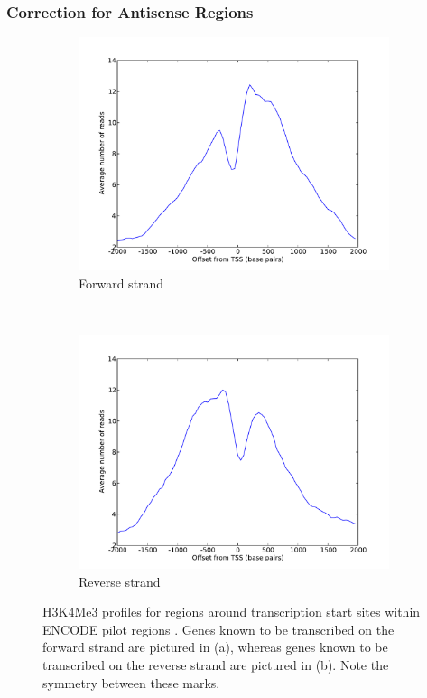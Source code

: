 \documentclass[parskip]{cs4rep}
\newcommand{\histonemodification}[1]{#1}
\begin{document}
\subsubsection{Correction for Antisense Regions}
\begin{figure}
    \centering
    \begin{subfigure}[b]{0.3\textwidth}
         \centering
         \includegraphics[width=\textwidth]{figures/DTW/forward_strand.pdf}
         \caption{Forward strand}
         \label{fig:DTW:antisense_comparison:forward}
    \end{subfigure}
    ~
    \begin{subfigure}[b]{0.3\textwidth}
         \centering
         \includegraphics[width=\textwidth]{figures/DTW/reverse_strand.pdf}
         \caption{Reverse strand}
         \label{fig:DTW:antisense_comparison:reverse}
    \end{subfigure}
    \caption{\histonemodification{H3K4Me3} profiles for regions around transcription start sites within ENCODE pilot regions \cite{ENCODEProjectConsortium:2007fu}. Genes known to be transcribed on the forward strand are pictured in (a), whereas genes known to be transcribed on the reverse strand are pictured in (b). Note the symmetry between these marks.}
    \label{fig:DTW:antisense_comparison}
\end{figure}
\end{document}
